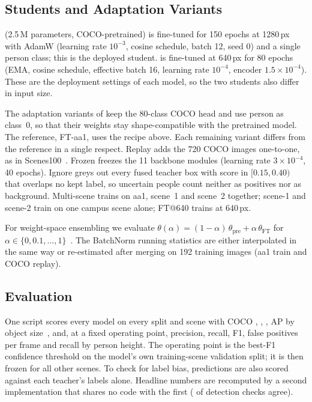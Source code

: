 \subsection{Students and Adaptation Variants}
\label{sec:variants}
\yolo{} (2.5\,M parameters, COCO-pretrained) is fine-tuned for 150 epochs at 1280\,px with AdamW (learning rate
$10^{-3}$, cosine schedule, batch 12, seed 0) and a single person class; this is the deployed student. \rfdetr{} is
fine-tuned at 640\,px for 80 epochs (EMA, cosine schedule, effective batch 16, learning rate $10^{-4}$, encoder
$1.5{\times}10^{-4}$). These are the deployment settings of each model, so the two students also differ in input size.

The adaptation variants of \yolo{} keep the 80-class COCO head and use person as class~0, so that their weights stay
shape-compatible with the pretrained model. The reference, FT-aa1, uses the recipe above. Each remaining variant differs
from the reference in a single respect. Replay adds the 720 COCO images one-to-one, as in Scenes100~\cite{zhang2023scenes100}. Frozen freezes
the 11 backbone modules (learning rate $3{\times}10^{-4}$, 40 epochs). Ignore greys out every fused teacher box with
score in $[0.15, 0.40)$ that overlaps no kept label, so uncertain people count neither as positives nor as
background. Multi-scene trains on aa1, scene~1 and scene~2 together; scene-1 and scene-2 train on one campus scene
alone; FT@640 trains at 640\,px.

For weight-space ensembling we evaluate
$\theta(\alpha)=(1-\alpha)\,\theta_{\text{pre}}+\alpha\,\theta_{\text{FT}}$ for
$\alpha\in\{0,0.1,\dots,1\}$~\cite{wortsman2022wise}. The BatchNorm running statistics are either interpolated in
the same way or re-estimated after merging on 192 training images (aa1 train and COCO replay).

\subsection{Evaluation}
\label{sec:eval}
One script scores every model on every split and scene with COCO \AP{}, \APf{}, \APs{}, AP by object
size~\cite{lin2014coco}, and, at a fixed operating point, precision, recall, F1, false positives per frame and recall
by person height. The operating point is the best-F1 confidence threshold on the model's own training-scene
validation split; it is then frozen for all other scenes. To check for label bias, predictions are also scored
against each teacher's labels alone. Headline numbers are recomputed by a second implementation that shares no code
with the first (\XcPass{} of \XcTotal{} detection checks agree).

